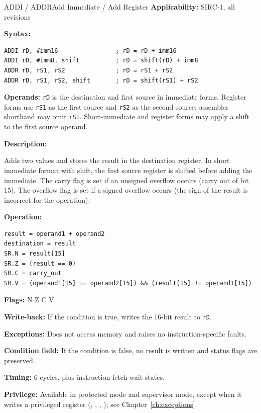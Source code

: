 \begin{instructionbox}{ADDI / ADDR}{Add Immediate / Add Register}
	\textbf{Applicability:} SIRC-1, all revisions

	\textbf{Syntax:}
	\begin{lstlisting}
ADDI rD, #imm16                ; rD = rD + imm16
ADDI rD, #imm8, shift          ; rD = shift(rD) + imm8
ADDR rD, rS1, rS2              ; rD = rS1 + rS2
ADDR rD, rS1, rS2, shift       ; rD = shift(rS1) + rS2
\end{lstlisting}

	\textbf{Operands:} \texttt{rD} is the destination and first source in immediate forms. Register forms use \texttt{rS1}
	as the first source and \texttt{rS2} as the second source; assembler shorthand may omit \texttt{rS1}. Short-immediate
	and register forms may apply a shift to the first source operand.

	\textbf{Description:}

	Adds two values and stores the result in the destination register. In short immediate format with shift, the first
	source register is shifted before adding the immediate. The carry flag is set if an unsigned overflow occurs (carry out
	of bit 15). The overflow flag is set if a signed overflow occurs (the sign of the result is incorrect for the
	operation).

	\textbf{Operation:}
	\begin{verbatim}
result = operand1 + operand2
destination = result
SR.N = result[15]
SR.Z = (result == 0)
SR.C = carry_out
SR.V = (operand1[15] == operand2[15]) && (result[15] != operand1[15])
\end{verbatim}

	\textbf{Flags:} N Z C V

	\textbf{Write-back:} If the condition is true, writes the 16-bit result to \texttt{rD}.

	\textbf{Exceptions:} Does not access memory and raises no instruction-specific faults.

	\textbf{Condition field:} If the condition is false, no result is written and status flags are preserved.

	\textbf{Timing:} 6 cycles, plus instruction-fetch wait states.

	\textbf{Privilege:} Available in protected mode and supervisor mode, except when it writes a
	privileged register (, , , ); see Chapter~\ref{ch:exceptions}.


\end{instructionbox}
